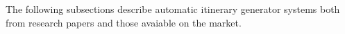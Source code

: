 The following subsections describe automatic itinerary
generator systems both from research papers and those
avaiable on the market.